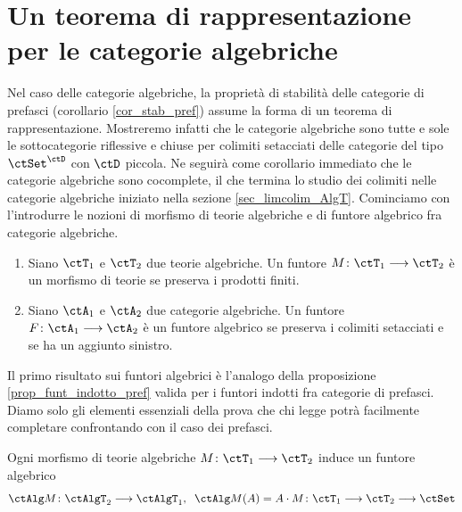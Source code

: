 \section{Un teorema di rappresentazione per le categorie algebriche}\label{sec_rappr_AlgT}

Nel caso delle categorie algebriche, la proprietà di stabilità delle categorie di prefasci (corollario \ref{cor_stab_pref})
assume la forma di un teorema di rappresentazione. Mostreremo infatti che le categorie algebriche sono tutte e
sole le sottocategorie riflessive e chiuse per colimiti setacciati delle categorie del tipo \(\ctSet^{\ctD}\) con \(\ctD\) piccola.
Ne seguirà come corollario immediato che le categorie algebriche sono cocomplete, il che termina lo studio dei colimiti
nelle categorie algebriche iniziato nella sezione \ref{sec_limcolim_AlgT}.
Cominciamo con l'introdurre le nozioni di morfismo di teorie algebriche e di funtore algebrico fra categorie algebriche.

\begin{definition}\label{def_morf_funt_alg}
 \hfill
 \begin{enumerate}
  \item Siano \(\ctT_1\) e \(\ctT_2\) due teorie algebriche. Un funtore \(M \colon \ctT_1 \fun \ctT_2\)
        è un morfismo di teorie se preserva i prodotti finiti.
  \item Siano \(\ctA_1\) e \(\ctA_2\) due categorie algebriche. Un funtore \(F \colon \ctA_1 \fun \ctA_2\)
        è un funtore algebrico se preserva i colimiti setacciati e se ha un aggiunto sinistro.
 \end{enumerate}
\end{definition}

Il primo risultato sui funtori algebrici è l'analogo della proposizione \ref{prop_funt_indotto_pref} valida per i
funtori indotti fra categorie di prefasci. Diamo solo gli elementi essenziali della prova che chi legge
potrà facilmente completare confrontando con il caso dei prefasci.

\begin{proposition}\label{prop_funt_alg_indotto}
 Ogni morfismo di teorie algebriche \(M \colon \ctT_1 \fun \ctT_2\) induce un funtore algebrico
 \[ \ctAlg M \colon \ctAlgT_2 \fun \ctAlgT_1, \;\; \ctAlg M(A) = A \cmp M \colon \ctT_1 \fun \ctT_2 \fun \ctSet \]
\end{proposition}

